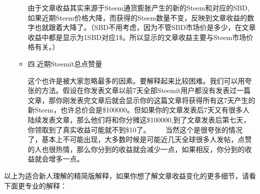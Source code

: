 \documentclass[]{ctexbook}
\begin{document}
\begin{itemize}
\begin{itemize}
    由于文章收益其实来源于Steem通货膨胀产生的新的Steem和对应的SBD,如果近期Steem价格大降，而获得的Steem数量不变，反映到文章收益的数字也就跟着大降了。（SBD不用考虑，因为不管SBD市场价是多少，在文章收益中都是显示为1SBD对应1\$。所以显示的文章收益主要与Steem市场价格有关。）
  \item
    四.近期Steemit总点赞量

    这个也许是被大家忽略最多的因素。要解释起来比较困难。我们可以用夸张的方法。假设在你发表文章以前7天全部Steemit用户都没有发表过一篇文章，那你刚发表完文章后就会显示你的这篇文章将获得所有这7天产生的新Steem，也许总价会是\$100000。但如果你的文章发表后7天又有很多人陆续发表文章，那么他们将和你分摊这\$100000,到了文章发表后第七天，你领取到了真实收益可能就不到\$10了。　
    　
    当然这个是很夸张的情况了，基本上不可能出现，大多数时候是可能近几天全球很多人发帖，点赞的人也很热情，那么你分到的收益就会减少一点，如果相反，你分到的收益就会增多一点。
  \end{itemize}
\end{itemize}

以上为适合新人理解的精简版解释，如果你想了解文章收益变化的更多细节，请看下面更专业的解释：
\end{document}
